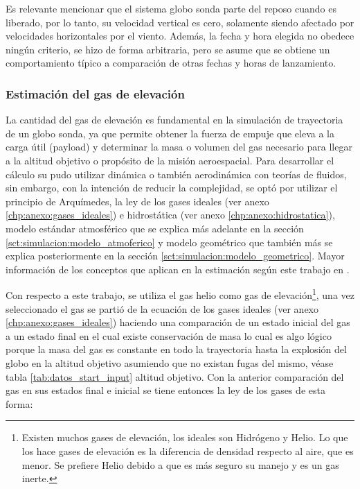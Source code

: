 

Es relevante mencionar que el sistema globo sonda parte del reposo cuando es liberado, por lo tanto, su velocidad vertical es cero, solamente siendo afectado por velocidades horizontales por el viento. Además, la fecha y hora elegida no obedece ningún criterio, se hizo de forma arbitraria, pero se asume que se obtiene un comportamiento típico a comparación de otras fechas y horas de lanzamiento.

\subsubsection{Estimación del gas de elevación} \label{ssct:simulacion:gas_y_peso}

La cantidad del gas de elevación es fundamental en la simulación de trayectoria de un globo sonda, ya que permite  obtener la fuerza de empuje que eleva a  la carga útil (payload) y determinar la masa o volumen del gas necesario para llegar a la altitud objetivo o propósito de la misión aeroespacial.  Para desarrollar el cálculo su pudo utilizar dinámica o también aerodinámica con teorías de fluidos, sin embargo, con la intención de reducir la complejidad,  se optó por utilizar  el principio de Arquímedes, la ley de los gases ideales (ver anexo \ref{chp:anexo:gases_ideales}) e hidrostática (ver anexo \ref{chp:anexo:hidrostatica}), modelo estándar atmosférico que se explica más adelante en la sección \ref{sct:simulacion:modelo_atmoferico}  y modelo geométrico que también más se explica posteriormente en la sección \ref{sct:simulacion:modelo_geometrico}. Mayor información de los conceptos que aplican en la estimación según este trabajo en \cite{libro_fisica_giancoli, isa_1976}. 

\newpage

Con respecto a este trabajo, se utiliza el gas helio como gas de elevación\footnote{Existen muchos gases de elevación, los ideales son Hidrógeno y Helio. Lo que los hace gases de elevación es la diferencia de densidad respecto al aire, que es menor. Se prefiere Helio debido a que es más seguro su manejo y es un gas inerte.},  una vez seleccionado el gas se partió de la ecuación de los gases ideales (ver anexo \ref{chp:anexo:gases_ideales})  haciendo una comparación de un estado inicial del gas a un estado final  en el cual existe conservación de masa lo cual es algo lógico porque la masa del gas es constante en todo la trayectoria hasta la explosión del globo en la altitud objetivo asumiendo que no existan fugas del mismo, véase tabla \ref{tab:datos_start_input} altitud objetivo.  Con la anterior comparación del gas en sus estados final e inicial se tiene entonces la ley de los gases de esta forma: 


